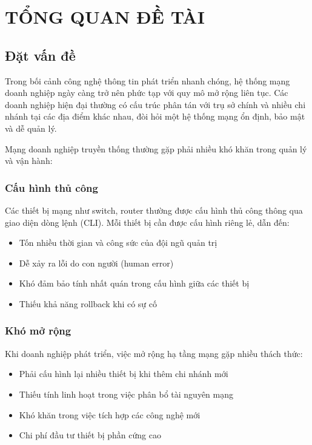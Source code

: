 \section{TỔNG QUAN ĐỀ TÀI}\label{sec:tong_quan}

\subsection{Đặt vấn đề}

Trong bối cảnh công nghệ thông tin phát triển nhanh chóng, hệ thống mạng doanh nghiệp ngày càng trở nên phức tạp với quy mô mở rộng liên tục. Các doanh nghiệp hiện đại thường có cấu trúc phân tán với trụ sở chính và nhiều chi nhánh tại các địa điểm khác nhau, đòi hỏi một hệ thống mạng ổn định, bảo mật và dễ quản lý.

Mạng doanh nghiệp truyền thống thường gặp phải nhiều khó khăn trong quản lý và vận hành:

\subsubsection{Cấu hình thủ công}
Các thiết bị mạng như switch, router thường được cấu hình thủ công thông qua giao diện dòng lệnh (CLI). Mỗi thiết bị cần được cấu hình riêng lẻ, dẫn đến:
\begin{itemize}
    \item Tốn nhiều thời gian và công sức của đội ngũ quản trị
    \item Dễ xảy ra lỗi do con người (human error)
    \item Khó đảm bảo tính nhất quán trong cấu hình giữa các thiết bị
    \item Thiếu khả năng rollback khi có sự cố
\end{itemize}

\subsubsection{Khó mở rộng}
Khi doanh nghiệp phát triển, việc mở rộng hạ tầng mạng gặp nhiều thách thức:
\begin{itemize}
    \item Phải cấu hình lại nhiều thiết bị khi thêm chi nhánh mới
    \item Thiếu tính linh hoạt trong việc phân bổ tài nguyên mạng
    \item Khó khăn trong việc tích hợp các công nghệ mới
    \item Chi phí đầu tư thiết bị phần cứng cao
\end{itemize}

